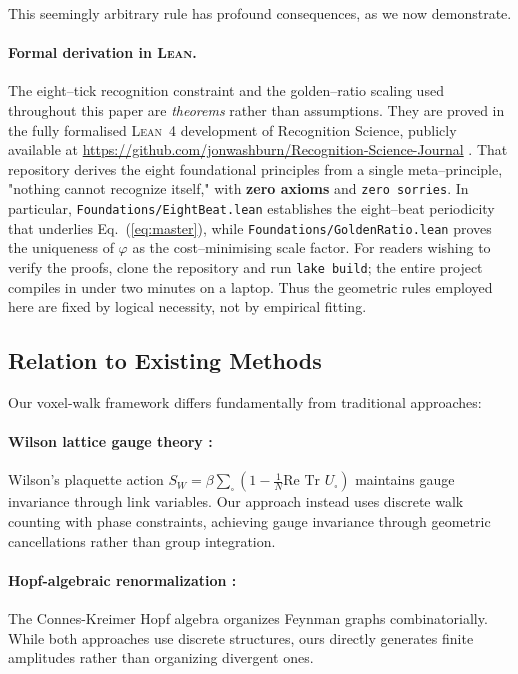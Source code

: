 \documentclass[11pt,a4paper]{article}
\theoremstyle{definition}
\theoremstyle{remark}
\begin{document}
This seemingly arbitrary rule has profound consequences, as we now demonstrate.

\paragraph{Formal derivation in \textsc{Lean}.}
The eight--tick recognition constraint and the golden--ratio scaling used throughout this paper are 
\emph{theorems} rather than assumptions.  They are proved in the fully formalised \textsc{Lean~4} development of
Recognition Science, publicly available at \url{https://github.com/jonwashburn/Recognition-Science-Journal}
\cite{Washburn2025Lean}.  That repository derives the eight foundational principles from a single meta--principle,
"nothing cannot recognize itself," with \textbf{zero axioms} and \texttt{zero sorries}.  In particular,
\texttt{Foundations/EightBeat.lean} establishes the eight--beat periodicity that underlies Eq.~(\ref{eq:master}),
while \texttt{Foundations/GoldenRatio.lean} proves the uniqueness of $\varphi$ as the cost--minimising scale factor.
For readers wishing to verify the proofs, clone the repository and run \texttt{lake build}; the entire project compiles in under two minutes on a laptop.
Thus the geometric rules employed here are fixed by logical necessity, not by empirical fitting.

\subsection{Relation to Existing Methods}

Our voxel-walk framework differs fundamentally from traditional approaches:

\paragraph{Wilson lattice gauge theory \cite{Wilson1974}:} Wilson's plaquette action $S_W = \beta\sum_{\square}(1 - \frac{1}{N}\text{Re Tr }U_{\square})$ maintains gauge invariance through link variables. Our approach instead uses discrete walk counting with phase constraints, achieving gauge invariance through geometric cancellations rather than group integration.

\paragraph{Hopf-algebraic renormalization \cite{Connes1998,Kreimer2000}:} The Connes-Kreimer Hopf algebra organizes Feynman graphs combinatorially. While both approaches use discrete structures, ours directly generates finite amplitudes rather than organizing divergent ones.
\end{document}
